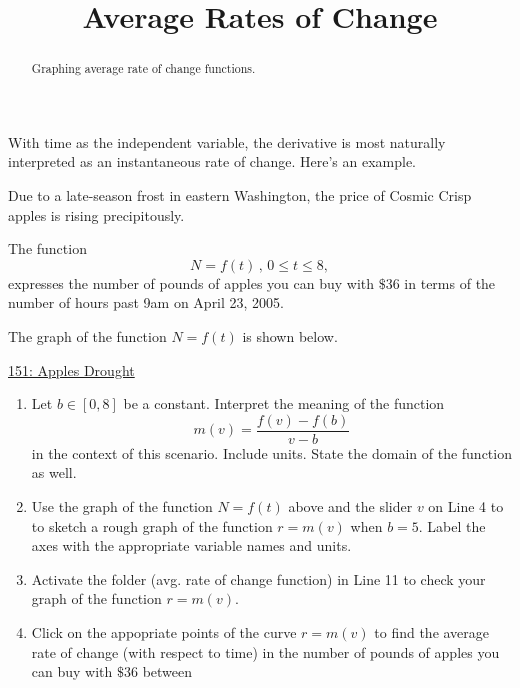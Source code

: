 \documentclass{ximera}
\title{Average Rates of Change}
\begin{document}
\begin{abstract}
Graphing average rate of change functions.
\end{abstract}
\maketitle


With time as the independent variable, the derivative is most naturally interpreted as an instantaneous rate of change. Here's an example. %

\begin{question}  \label{Q4ghg5df5yhhfg4tr4}
Due to a late-season frost in eastern Washington, the price of Cosmic Crisp apples is rising precipitously.

The function
\[
      N = f(t)  \, , \, 0\leq t \leq 8 ,                     %
\]
expresses the number of pounds of apples you can buy with $\$36$ in terms of the number of hours past 9am on April 23, 2005. 

The graph of the function $N=f(t)$ is shown below.

\begin{onlineOnly}
    \begin{center}
\end{center}
\end{onlineOnly}

\href{https://www.desmos.com/calculator/njanpkrqex}{151: Apples Drought}

\begin{enumerate}

\item Let $b\in [0,8]$ be a constant. Interpret the meaning of the function
\[
   m(v) =  \frac{f(v)-f(b)}{v-b}
\]
in the context of this scenario. Include units. State the domain of the function as well.

\item Use the graph of the function $N=f(t)$ above and the slider $v$ on Line 4 to to sketch a rough graph of the function $r=m(v)$ when $b=5$. Label the axes with the appropriate variable names and units.

\item Activate the folder (avg. rate of change function) in Line 11 to check your graph of the function $r=m(v)$. 

\item Click on the appopriate points of the curve $r=m(v)$ to find the average rate of change (with respect to time) in the number of pounds of apples you can buy with $\$36$ between 


\end{enumerate}
\end{question}
\end{document}
